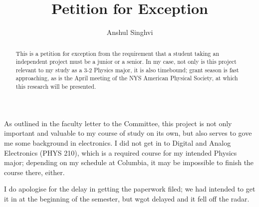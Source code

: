 \documentclass[12pt]{article}
\title{Petition for Exception}
\author{Anshul Singhvi}
\begin{document}
\maketitle

\begin{abstract}
  This is a petition for exception from the requirement that a student taking an independent project must be a junior or a senior.  In my case, not only is this project relevant to my study as a 3-2 Physics major, it is also timebound; grant season is fast approaching, as is the April meeting of the NYS American Physical Society, at which this research will be presented.
\end{abstract}

As outlined in the faculty letter to the Committee, this project is not only important and valuable to my course of study on its own, but also serves to gove me some background in electronics.  I did not get in to Digital and Analog Electronics (PHYS 210), which is a required course for my intended Physics major; depending on my schedule at Columbia, it may be impossible to finish the course there, either.

I do apologise for the delay in getting the paperwork filed; we had intended to get it in at the beginning of the semester, but wgot delayed and it fell off the radar.
\end{document}

